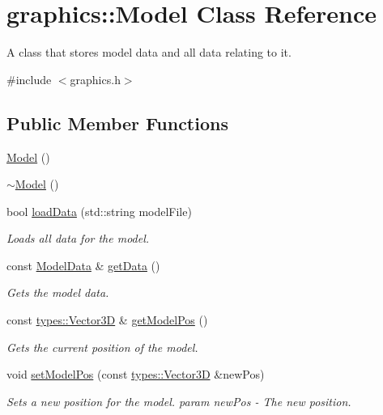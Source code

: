 \hypertarget{classgraphics_1_1_model}{}\section{graphics\+:\+:Model Class Reference}
\label{classgraphics_1_1_model}


A class that stores model data and all data relating to it.  




{\ttfamily \#include $<$graphics.\+h$>$}

\subsection*{Public Member Functions}
\begin{DoxyCompactItemize}
\item 
\hyperlink{classgraphics_1_1_model_ad1de45d8f268f85a9f343d5d766d79fb}{Model} ()
\item 
\hyperlink{classgraphics_1_1_model_a8e0ae4b91895af2be67a040f76b210f2}{$\sim$\+Model} ()
\item 
bool \hyperlink{classgraphics_1_1_model_a64ac4fc8a029a5bdda2a5e8744aa2093}{load\+Data} (std\+::string model\+File)
\begin{DoxyCompactList}\small\item\em Loads all data for the model. \end{DoxyCompactList}\item 
const \hyperlink{structgraphics_1_1_model_data}{Model\+Data} \& \hyperlink{classgraphics_1_1_model_a29c0c0ac00b5ad67c42234eca20a7fa3}{get\+Data} ()
\begin{DoxyCompactList}\small\item\em Gets the model data. \end{DoxyCompactList}\item 
const \hyperlink{structtypes_1_1_vector3_d}{types\+::\+Vector3\+D} \& \hyperlink{classgraphics_1_1_model_a23d6b9aae51566bf56389e5f3f3024ac}{get\+Model\+Pos} ()
\begin{DoxyCompactList}\small\item\em Gets the current position of the model. \end{DoxyCompactList}\item 
void \hyperlink{classgraphics_1_1_model_a37d9bae70b24d66c720966910b2632fa}{set\+Model\+Pos} (const \hyperlink{structtypes_1_1_vector3_d}{types\+::\+Vector3\+D} \&new\+Pos)
\begin{DoxyCompactList}\small\item\em Sets a new position for the model. param new\+Pos -\/ The new position. \end{DoxyCompactList}\end{DoxyCompactItemize}


